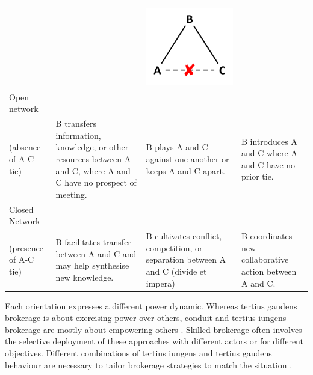 \begin{table}
{\begin{threeparttable}
\begin{tabular*}{\textwidth}{>{\raggedright}p{5cm}>{\raggedright\arraybackslash}p{6cm}>{\raggedright\arraybackslash}p{6cm}>{\raggedright\arraybackslash}p{6cm}}
&  & \begin{minipage}{0.2\textwidth} \centering \includegraphics[width=0.7\linewidth]{Images/TG_brokerage_2} \end{minipage}  & \\
\midrule
Open network\\(absence of A-C tie) & B transfers information, knowledge, or other resources between A and C, where A and C have no prospect of meeting. & B plays A and C against one another or keeps A and C apart. & B introduces A and C where A and C have no prior tie. \\
\midrule
Closed Network\\(presence of A-C tie) & B facilitates transfer between A and C and may help synthesise new knowledge. & B cultivates conflict, competition, or separation between A and C (divide et impera) & B coordinates new collaborative action between A and C.  \\ 
\bottomrule
\end{tabular*}
\end{threeparttable}
}
\end{table}

Each orientation expresses a different power dynamic. Whereas tertius gaudens brokerage is about exercising power over others, conduit and tertius iungens brokerage are mostly about empowering others \citep{fleming2007collaborative,obstfeld2014brokerage}. Skilled brokerage often involves the selective deployment of these approaches with different actors or for different objectives. Different combinations of tertius iungens and tertius gaudens behaviour are necessary to tailor brokerage strategies to match the situation \citep{lingo2010nexus,obstfeld2014brokerage,quintane2016brokers}. \medskip

